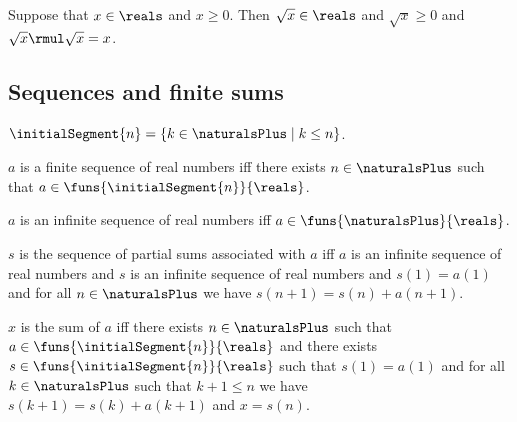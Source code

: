 \begin{axiom} \label{positive_square_root}
    Suppose that $x \in\reals$ and $x \geq 0$.
    Then $\sqrt{x} \in \reals$ and $\sqrt{x} \geq 0$ and $\sqrt{x} \rmul \sqrt{x} = x$.
\end{axiom}    


\subsection{Sequences and finite sums}

\begin{definition}\label{initial_segment_naturalsplus}
    $\initialSegment{n} = \{k\in\naturalsPlus \mid k \leq n\}$.
\end{definition}

\begin{definition}\label{finite_real_sequence}
    $a$ is a finite sequence of real numbers iff
    there exists $n\in\naturalsPlus$ such that
    $a\in\funs{\initialSegment{n}}{\reals}$.
\end{definition}

\begin{definition}\label{infinite_real_sequence}
    $a$ is an infinite sequence of real numbers iff
    $a\in\funs{\naturalsPlus}{\reals}$.
\end{definition}

\begin{definition}\label{partial_sums_sequence}
    $s$ is the sequence of partial sums associated with $a$ iff
    $a$ is an infinite sequence of real numbers and
    $s$ is an infinite sequence of real numbers and
    $s(1) = a(1)$ and
    for all $n\in\naturalsPlus$ we have
    $s(n + 1) = s(n) + a(n + 1)$.
\end{definition}

\begin{definition}\label{sum_of_finite_sequence}
    $x$ is the sum of $a$ iff
    there exists $n\in\naturalsPlus$ such that
    $a\in\funs{\initialSegment{n}}{\reals}$ and
    there exists $s\in\funs{\initialSegment{n}}{\reals}$ such that
    $s(1) = a(1)$ and
    for all $k\in\naturalsPlus$ such that $k + 1 \leq n$ we have
    $s(k + 1) = s(k) + a(k + 1)$ and
    $x = s(n)$.
\end{definition}


